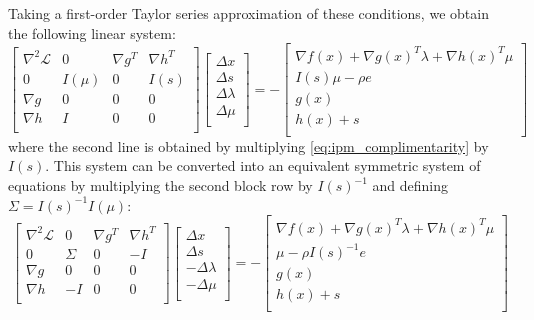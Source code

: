\documentclass[../root.tex]{subfiles}
\begin{document}
    Taking a first-order Taylor series approximation of these conditions, we
    obtain the following linear system:
    \begin{equation}
        \begin{bmatrix}
            \nabla^2 \mathcal{L} & 0 & \nabla g^T & \nabla h^T \\
            0 & I(\mu) & 0 & I(s) \\
            \nabla g & 0 & 0 & 0 \\
            \nabla h & I & 0 & 0 \\
        \end{bmatrix}
        \begin{bmatrix}
            \Delta x \\
            \Delta s \\
            \Delta \lambda \\
            \Delta \mu\\
        \end{bmatrix} = -
        \begin{bmatrix}
            \nabla f(x) + \nabla g(x)^T \lambda + \nabla h(x)^T \mu \\
            I(s) \mu - \rho e \\
            g(x) \\
            h(x) + s \\
        \end{bmatrix}
    \end{equation}
    where the second line is obtained by multiplying \eqref{eq:ipm_complimentarity} by $I(s)$.
    This system can be converted into an equivalent symmetric system of equations by multiplying
    the second block row by $I(s)^{-1}$ and defining $\Sigma = I(s)^{-1} I(\mu)$:
    \begin{equation}
        \begin{bmatrix}
            \nabla^2 \mathcal{L} & 0 & \nabla g^T & \nabla h^T \\
            0 & \Sigma & 0 & -I \\
            \nabla g & 0 & 0 & 0 \\
            \nabla h & -I & 0 & 0 \\
        \end{bmatrix} 
        \begin{bmatrix}
            \Delta x \\
            \Delta s \\
            -\Delta \lambda \\
            -\Delta \mu\\
        \end{bmatrix} = -
        \begin{bmatrix}
            \nabla f(x) + \nabla g(x)^T \lambda + \nabla h(x)^T \mu \\
            \mu - \rho I(s)^{-1} e \\
            g(x) \\
            h(x) + s \\
        \end{bmatrix}
    \end{equation}
\end{document}
